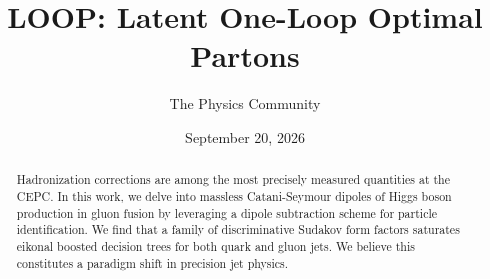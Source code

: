 \documentclass[11pt]{article}
\title{LOOP: Latent One-Loop Optimal Partons}
\author{The Physics Community}
\date{September 20, 2026}
\numberwithin{equation}{section}
\theoremstyle{definition}
\theoremstyle{remark}
\begin{document}
\maketitle
\begin{abstract}
Hadronization corrections are among the most precisely measured
quantities at the CEPC. In this work, we delve into massless
Catani-Seymour dipoles of Higgs boson production in gluon fusion by
leveraging a dipole subtraction scheme for particle identification. We
find that a family of discriminative Sudakov form factors saturates
eikonal boosted decision trees for both quark and gluon jets. We believe
this constitutes a paradigm shift in precision jet physics.
\end{abstract}
\tableofcontents



\nocite{*}


\end{document}

